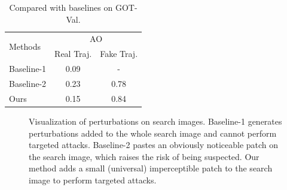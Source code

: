 \documentclass[journal]{IEEEtran}
\begin{document}
\begin{table}[t]
  \centering
  \caption{Compared with baselines on GOT-Val.}
  \begin{tabular}{@{}lcc@{}}
    \toprule
    \multirow{2}{*}[-2pt]{Methods}  & \multicolumn{2}{c}{AO}\\ \cmidrule{2-3}
          & Real Traj. & Fake Traj.\\ \midrule
  Baseline-1 \cite{UAP}  & 0.09          & -\\
  Baseline-2 \cite{patch}   & 0.23       & 0.78\\
    Ours & 0.15       & 0.84\\ \bottomrule
    \end{tabular}
  \label{tab:imperceptible}
  \end{table}
  
  \begin{figure}
    \centering
    \caption{Visualization of perturbations on search images. Baseline-1 generates perturbations added to the whole search image and cannot perform targeted attacks. Baseline-2 pastes an obviously noticeable patch on the search image, which raises the risk of being suspected. Our method adds a small (universal) imperceptible patch to the search image to perform targeted attacks.}
    \label{fig:imperceptible}
  \end{figure}
  
\end{document}
